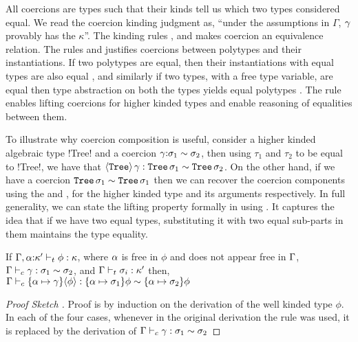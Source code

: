 \documentclass[screen,nonacm]{acmart}
\begin{document}
All coercions are types such that their kinds tell us which two types
considered equal. We read the coercion kinding judgment
\fbox{$\CoKinding \Gamma \Co \kappa$} as, ``under the assumptions in
$\Gamma$, $\gamma$ provably has the $\kappa$''. The kinding rules
,  and  makes coercion an
equivalence relation. The rules  and
 justifies coercions between polytypes and their
instantiations. If two polytypes are equal, then their instantiations
with equal types are also equal , and similarly
if two types, with a free type variable, are equal then type
abstraction on both the types yields equal polytypes
. The rule  enables lifting
coercions for higher kinded types and enable reasoning of equalities
between them.

To illustrate why coercion composition is useful, consider a higher
kinded algebraic type !Tree! and a coercion
$\gamma{:}\sigma_1\sim\sigma_2$, then using $\tau_1$ and $\tau_2$ to be
equal to !Tree!, we have that $\langle{\texttt{Tree}}\rangle \,\gamma :
\texttt{Tree}\,\sigma_1 \sim \texttt{Tree}\,\sigma_2$. On the
other hand, if we have a coercion $\texttt{Tree}\,\sigma_1 \sim
\texttt{Tree}\,\sigma_1$ then we can recover the coercion components
using the  and , for the higher kinded
type and its arguments respectively. In full generality, we can state
the lifting property formally in \SFC using
. It captures the idea that
if we have two equal types, substituting it with two equal sub-parts
in them maintains the type equality.

\begin{theorem}\label{thm:sfc-coercion-lifting}
 If $\Gamma,\alpha{:}\kappa' \vdash_{t} \phi : \kappa$, where $\alpha$ is free in $\phi$
 and does not appear free in $\Gamma$,
 $\Gamma \vdash_{c} \gamma : \sigma_1\sim\sigma_2$, and $\Gamma \vdash_{t} \sigma_i : \kappa'$
 then, $\Gamma \vdash_{c} \{\alpha\mapsto \gamma\}\langle{\phi}\rangle : \{\alpha\mapsto\sigma_1\}\phi\sim\{\alpha\mapsto\sigma_2\}\phi$
\end{theorem}
\begin{proof}[Proof Sketch ]
 Proof is by induction on the derivation of the well kinded type
 $\phi$. In each of the four cases, whenever in the original
 derivation the rule  was used, it is replaced by the
 derivation of $\Gamma \vdash_{c} \gamma : \sigma_1\sim\sigma_2$
\end{proof}
\end{document}
